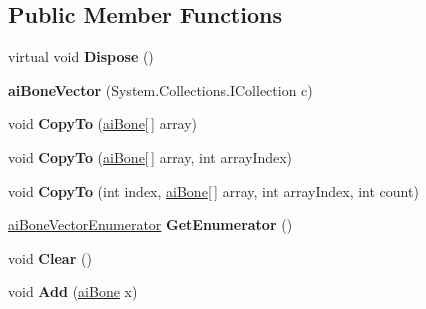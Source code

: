 \subsection*{Public Member Functions}
\begin{DoxyCompactItemize}
\item 
\hypertarget{classai_bone_vector_aad3b1e269cb2015f6a7f599ba96878cc}{virtual void {\bfseries Dispose} ()}\label{classai_bone_vector_aad3b1e269cb2015f6a7f599ba96878cc}

\item 
\hypertarget{classai_bone_vector_ac405a8972c9dac13670d8aba9c7d7447}{{\bfseries ai\+Bone\+Vector} (System.\+Collections.\+I\+Collection c)}\label{classai_bone_vector_ac405a8972c9dac13670d8aba9c7d7447}

\item 
\hypertarget{classai_bone_vector_a1bad4ce01e26661995336edad6b8e012}{void {\bfseries Copy\+To} (\hyperlink{structai_bone}{ai\+Bone}\mbox{[}$\,$\mbox{]} array)}\label{classai_bone_vector_a1bad4ce01e26661995336edad6b8e012}

\item 
\hypertarget{classai_bone_vector_ad1c0f1da97c5cb66b36ad90f84faad74}{void {\bfseries Copy\+To} (\hyperlink{structai_bone}{ai\+Bone}\mbox{[}$\,$\mbox{]} array, int array\+Index)}\label{classai_bone_vector_ad1c0f1da97c5cb66b36ad90f84faad74}

\item 
\hypertarget{classai_bone_vector_aaedcd363c71e5950eb37e25e84d7be96}{void {\bfseries Copy\+To} (int index, \hyperlink{structai_bone}{ai\+Bone}\mbox{[}$\,$\mbox{]} array, int array\+Index, int count)}\label{classai_bone_vector_aaedcd363c71e5950eb37e25e84d7be96}

\item 
\hypertarget{classai_bone_vector_afcb206a05f2ddd5a92b12aa36a751832}{\hyperlink{classai_bone_vector_1_1ai_bone_vector_enumerator}{ai\+Bone\+Vector\+Enumerator} {\bfseries Get\+Enumerator} ()}\label{classai_bone_vector_afcb206a05f2ddd5a92b12aa36a751832}

\item 
\hypertarget{classai_bone_vector_a9f66b18b8d7bb287f9fe5f2d3c1fa74c}{void {\bfseries Clear} ()}\label{classai_bone_vector_a9f66b18b8d7bb287f9fe5f2d3c1fa74c}

\item 
\hypertarget{classai_bone_vector_a35423c786a9059fc3f4a0a0bdcaa4d0d}{void {\bfseries Add} (\hyperlink{structai_bone}{ai\+Bone} x)}\label{classai_bone_vector_a35423c786a9059fc3f4a0a0bdcaa4d0d}


\end{DoxyCompactItemize}
